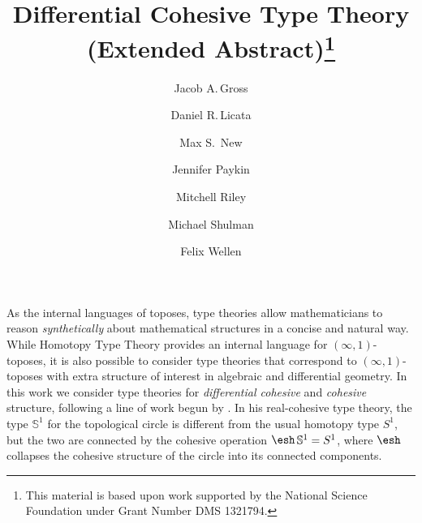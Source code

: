 \documentclass{article}
\title{Differential Cohesive Type Theory (Extended Abstract)\thanks{This
    material is based upon work supported by the National Science Foundation
    under Grant Number DMS 1321794.}}
\author{Jacob A.\,Gross}
\affil[1]{University of Pittsburgh}
\author[2]{Daniel R.\,Licata}
\affil[2]{Wesleyan University}
\author[3]{Max S.\, New}
\affil[3]{Northeastern University}
\author[4]{Jennifer Paykin}
\affil[4]{University of Pennsylvania}
\author[2]{Mitchell Riley}
\author[5]{Michael Shulman}
\affil[5]{University of San Diego}
\author[6]{Felix Wellen}
\affil[6]{Karlsruhe Institute of Technology}
\date{}
\begin{document}
\maketitle



As the internal languages of toposes, type theories allow mathematicians to
reason \emph{synthetically} about mathematical structures in a concise and
natural way. While Homotopy Type Theory provides an internal language for
$(\infty,1)$-toposes, it is also possible to consider type theories that
correspond to $(\infty,1)$-toposes with extra structure of interest in algebraic
and differential geometry. In this work we consider type theories for
\emph{differential cohesive} and \emph{cohesive} structure, following a line of
work begun by \citet{Shulman2015}.
In his real-cohesive type theory, the type $\mathbb S^1$ for the topological
circle is different from the usual homotopy type $S^1$, but the two are
connected by the cohesive operation $\shape\,\mathbb S^1=S^1$, where $\shape$
collapses the cohesive structure of the circle into its connected components.


%
\end{document}
